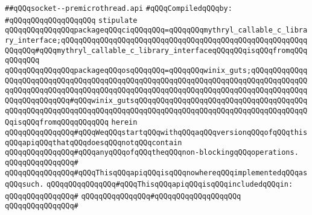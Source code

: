 \label{src/lib/std/src/socket/socket--premicrothread.api}
\verb|##qQQqsocket--premicrothread.api|\newline
\newline
\verb|#qQQqCompiledqQQqby:|\newline
\verb|#qQQqqQQqqQQqqQQqqQQq|\newline
\newline
\newline
\newline
\verb|stipulate|\newline
\verb|qQQqqQQqqQQqqQQqpackageqQQqciqQQqqQQq=qQQqqQQqmythryl_callable_c_library_interface;qQQqqQQqqQQqqQQqqQQqqQQqqQQqqQQqqQQqqQQqqQQqqQQqqQQqqQQqqQQqqQQq#qQQqmythryl_callable_c_library_interfaceqQQqqQQqisqQQqfromqQQqqQQqqQQq|\newline
\verb|qQQqqQQqqQQqqQQqpackageqQQqosqQQqqQQq=qQQqqQQqwinix_guts;qQQqqQQqqQQqqQQqqQQqqQQqqQQqqQQqqQQqqQQqqQQqqQQqqQQqqQQqqQQqqQQqqQQqqQQqqQQqqQQqqQQqqQQqqQQqqQQqqQQqqQQqqQQqqQQqqQQqqQQqqQQqqQQqqQQqqQQqqQQqqQQqqQQqqQQqqQQqqQQqqQQqqQQq#qQQqwinix_gutsqQQqqQQqqQQqqQQqqQQqqQQqqQQqqQQqqQQqqQQqqQQqqQQqqQQqqQQqqQQqqQQqqQQqqQQqqQQqqQQqqQQqqQQqqQQqqQQqqQQqqQQqqQQqqQQqisqQQqfromqQQqqQQqqQQq|\newline
\verb|herein|\newline
\newline
\verb|qQQqqQQqqQQqqQQq#qQQqWeqQQqstartqQQqwithqQQqaqQQqversionqQQqofqQQqthisqQQqapiqQQqthatqQQqdoesqQQqnotqQQqcontain|\newline
\verb|qQQqqQQqqQQqqQQq#qQQqanyqQQqofqQQqtheqQQqnon-blockingqQQqoperations.|\newline
\verb|qQQqqQQqqQQqqQQq#|\newline
\verb|qQQqqQQqqQQqqQQq#qQQqThisqQQqapiqQQqisqQQqnowhereqQQqimplementedqQQqasqQQqsuch.|\newline
\verb|qQQqqQQqqQQqqQQq#qQQqThisqQQqapiqQQqisqQQqincludedqQQqin:|\newline
\verb|qQQqqQQqqQQqqQQq#|\newline
\verb|qQQqqQQqqQQqqQQq#qQQqqQQqqQQqqQQqqQQq|\newline
\verb|qQQqqQQqqQQqqQQq#|\newline
